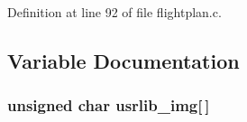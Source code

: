 \-Definition at line 92 of file flightplan.\-c.



\subsection{\-Variable \-Documentation}
\hypertarget{group___flight_plan_ga1b19f06091de608524755a14f6df45d3}{
\subsubsection[{usrlib\-\_\-img}]{\setlength{\rightskip}{0pt plus 5cm}unsigned char {\bf usrlib\-\_\-img}\mbox{[}$\,$\mbox{]}}}\label{group___flight_plan_ga1b19f06091de608524755a14f6df45d3}
